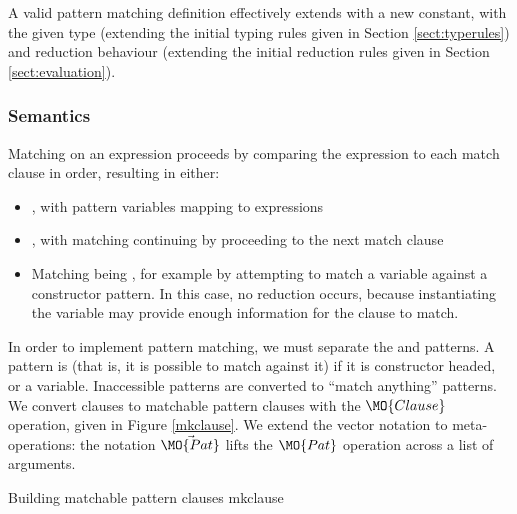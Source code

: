 A valid pattern matching definition effectively extends \TT{} with a new constant,
with the given type (extending the initial typing rules given in Section \ref{sect:typerules})
and reduction behaviour (extending the initial reduction rules given in Section
\ref{sect:evaluation}). 

\subsubsection{Semantics}

Matching on an expression proceeds by comparing the expression to
each match clause in order, resulting in either:

\begin{itemize}
\item {}, with pattern variables mapping to expressions
\item {}, with matching continuing by proceeding to the next match clause
\item Matching being , for example by attempting to match a variable
against a constructor pattern. In this case, no reduction occurs, because instantiating
the variable may provide enough information for the clause to match.
\end{itemize}


In order to implement pattern matching, we must separate the  and
 patterns. A pattern is  (that is, it is possible
to match against it) if it is constructor headed, or a variable. Inaccessible patterns
are converted to ``match anything'' patterns. We convert clauses to matchable pattern
clauses with the $\MO{Clause}$ operation, given in Figure \ref{mkclause}.
We extend the vector notation to meta-operations: the notation $\vec{\MO{Pat}}$ lifts the
$\MO{Pat}$ operation across a list of arguments.

{Building matchable pattern clauses}
{mkclause}


